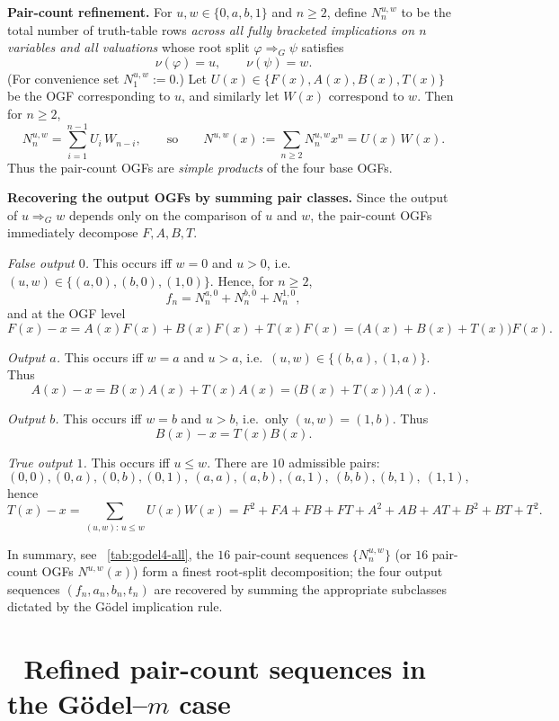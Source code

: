 \documentclass[11pt]{article}
\begin{document}
\medskip
\noindent\textbf{Pair-count refinement.}
For $u,w\in\{0,a,b,1\}$ and $n\ge2$, define $N^{u,w}_n$ to be the total number of truth-table rows
\emph{across all fully bracketed implications on $n$ variables and all valuations} whose root split
$\varphi\Rightarrow_G\psi$ satisfies
\[
\nu(\varphi)=u,\qquad \nu(\psi)=w.
\]
(For convenience set $N^{u,w}_1:=0$.)  Let $U(x)\in\{F(x),A(x),B(x),T(x)\}$ be the OGF corresponding to $u$,
and similarly let $W(x)$ correspond to $w$. Then for $n\ge2$,
\[
N^{u,w}_n=\sum_{i=1}^{n-1} U_i\,W_{n-i},
\qquad\text{so}\qquad
N^{u,w}(x):=\sum_{n\ge2}N^{u,w}_n x^n = U(x)\,W(x).
\]
Thus the pair-count OGFs are \emph{simple products} of the four base OGFs.

\medskip
\noindent\textbf{Recovering the output OGFs by summing pair classes.}
Since the output of $u\Rightarrow_G w$ depends only on the comparison of $u$ and $w$, the pair-count OGFs
immediately decompose $F,A,B,T$.

\medskip
\noindent\emph{False output $0$.}
This occurs iff $w=0$ and $u>0$, i.e.\ $(u,w)\in\{(a,0),(b,0),(1,0)\}$. Hence, for $n\ge2$,
\[
f_n = N^{a,0}_n+N^{b,0}_n+N^{1,0}_n,
\]
and at the OGF level
\[
F(x)-x = A(x)F(x)+B(x)F(x)+T(x)F(x)=\bigl(A(x)+B(x)+T(x)\bigr)F(x).
\]

\medskip
\noindent\emph{Output $a$.}
This occurs iff $w=a$ and $u>a$, i.e.\ $(u,w)\in\{(b,a),(1,a)\}$. Thus
\[
A(x)-x = B(x)A(x)+T(x)A(x)=\bigl(B(x)+T(x)\bigr)A(x).
\]

\medskip
\noindent\emph{Output $b$.}
This occurs iff $w=b$ and $u>b$, i.e.\ only $(u,w)=(1,b)$. Thus
\[
B(x)-x = T(x)B(x).
\]

\medskip
\noindent\emph{True output $1$.}
This occurs iff $u\le w$. There are $10$ admissible pairs:
\[
(0,0),(0,a),(0,b),(0,1),\ (a,a),(a,b),(a,1),\ (b,b),(b,1),\ (1,1),
\]
hence
\[
T(x)-x=\!\!\sum_{(u,w):\,u\le w}\! U(x)W(x)
=F^2+FA+FB+FT+A^2+AB+AT+B^2+BT+T^2.
\]

\medskip
In summary, see ~\ref{tab:godel4-all}, the $16$ pair-count sequences $\{N_n^{u,w}\}$ (or $16$ pair-count OGFs $N^{u,w}(x)$) form a
finest root-split decomposition; the four output sequences $(f_n,a_n,b_n,t_n)$ are recovered by summing the
appropriate subclasses dictated by the G\"odel implication rule.


\section{ $\;$ Refined pair-count sequences in the G\"odel--$m$ case}\label{app:godelm-pair-sequences}
\end{document}
